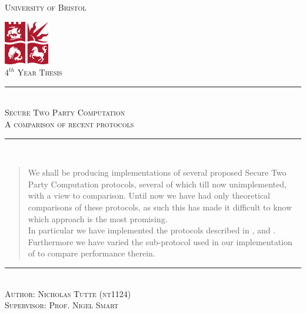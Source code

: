 \documentclass[a4paper,11pt]{article}
\newcommand{\HRule}{\rule{\linewidth}{0.5mm}}
\begin{document}
	\begin{titlepage}
		\begin{center}

			\textsc{\LARGE University of Bristol}
			\vspace{2cm}
    
			\includegraphics[width=0.15\textwidth]{./bristolunilogo}~\\[1cm]
    
			\textsc{\Large $4^{th}$ Year Thesis}
    
			\vspace{3cm}
			\HRule \\[0.4cm]
			\textsc{ \huge Secure Two Party Computation}\\
			\textsc{ \large A comparison of recent protocols}\\
			\HRule \\[0.4cm]
			\vspace{2cm}
    
			\begin{abstract}
				We shall be producing implementations of several proposed Secure Two Party Computation protocols, several of which till now unimplemented, with a view to comparison. Until now we have had only theoretical comparisons of these protocols, as such this has made it difficult to know which approach is the most promising.\\
				
				In particular we have implemented the protocols described in \cite{Lindell_CnC_2013}, \cite{LindellPinkas2010} and \cite{Katz_Symm_CnC_2013}. Furthermore we have varied the sub-protocol used in our implementation of \cite{Lindell_CnC_2013} to compare performance therein.
			\end{abstract}
    
			\vspace{2.6cm}
			\noindent\rule{12cm}{0.2pt}\\[0.2cm]
			\textsc{\Large Author: Nicholas Tutte (nt1124)}\\[0.2cm]
			\textsc{\Large Supervisor: Prof. Nigel Smart}
    
		\end{center}
	\end{titlepage}

	
	
\end{document}

